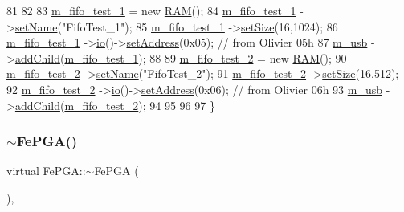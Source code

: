 \begin{DoxyCode}
81   
82 
83   \hyperlink{classFePGA_af911fcb4fc76acd553e9a492174f134b}{m\_fifo\_test\_1}    = \textcolor{keyword}{new} \hyperlink{classRAM}{RAM}();  
84   \hyperlink{classFePGA_af911fcb4fc76acd553e9a492174f134b}{m\_fifo\_test\_1}    ->\hyperlink{classObject_ae30fea75683c2d149b6b6d17c09ecd0c}{setName}(\textcolor{stringliteral}{"FifoTest\_1"});
85   \hyperlink{classFePGA_af911fcb4fc76acd553e9a492174f134b}{m\_fifo\_test\_1}    ->\hyperlink{classRAM_adcf2ebb12f1a3e833ce7d5a33670c29d}{setSize}(16,1024);        
86   \hyperlink{classFePGA_af911fcb4fc76acd553e9a492174f134b}{m\_fifo\_test\_1}    ->\hyperlink{classIOobject_af04fb94137c3d86849f478ac5afab5d1}{io}()->\hyperlink{classIOdata_af98cbfbc28346ebb9b64ca0203af1463}{setAddress}(0x05); \textcolor{comment}{// from Olivier 05h}
87   \hyperlink{classFePGA_afb7947e600a66d914ee524acec3d8b1f}{m\_usb}            ->\hyperlink{classHierarchy_ad677774ff38fcb257c04a3a10d471fac}{addChild}(\hyperlink{classFePGA_af911fcb4fc76acd553e9a492174f134b}{m\_fifo\_test\_1});  
88 
89   \hyperlink{classFePGA_ad42013742385c695067b466c933665c9}{m\_fifo\_test\_2}    = \textcolor{keyword}{new} \hyperlink{classRAM}{RAM}();  
90   \hyperlink{classFePGA_ad42013742385c695067b466c933665c9}{m\_fifo\_test\_2}    ->\hyperlink{classObject_ae30fea75683c2d149b6b6d17c09ecd0c}{setName}(\textcolor{stringliteral}{"FifoTest\_2"});
91   \hyperlink{classFePGA_ad42013742385c695067b466c933665c9}{m\_fifo\_test\_2}    ->\hyperlink{classRAM_adcf2ebb12f1a3e833ce7d5a33670c29d}{setSize}(16,512);        
92   \hyperlink{classFePGA_ad42013742385c695067b466c933665c9}{m\_fifo\_test\_2}    ->\hyperlink{classIOobject_af04fb94137c3d86849f478ac5afab5d1}{io}()->\hyperlink{classIOdata_af98cbfbc28346ebb9b64ca0203af1463}{setAddress}(0x06); \textcolor{comment}{// from Olivier 06h}
93   \hyperlink{classFePGA_afb7947e600a66d914ee524acec3d8b1f}{m\_usb}            ->\hyperlink{classHierarchy_ad677774ff38fcb257c04a3a10d471fac}{addChild}(\hyperlink{classFePGA_ad42013742385c695067b466c933665c9}{m\_fifo\_test\_2});  
94   
95 
96 
97 \}
\end{DoxyCode}
\mbox{\label{classFePGA_aa445095a44c521b6b7803feaef6c16ba}} 
\subsubsection{\texorpdfstring{$\sim$\+Fe\+P\+G\+A()}{~FePGA()}}
{\footnotesize\ttfamily virtual Fe\+P\+G\+A\+::$\sim$\+Fe\+P\+GA (\begin{DoxyParamCaption}{ }\end{DoxyParamCaption})\hspace{0.3cm}{\ttfamily [inline]}, {\ttfamily [virtual]}}



